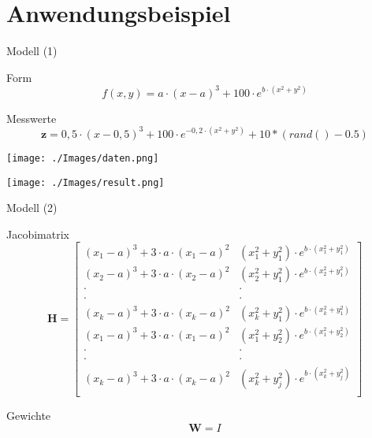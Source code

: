 \documentclass[8pt, t, aspectratio=169,%
]{beamer}
\begin{document}
\section{Anwendungsbeispiel}



\begin{frame}{Modell (1)}

Form
\begin{equation}
	f(x,y) = a \cdot (x-a)^3+100\cdot e^{b\cdot(x^2+y^2)}
\end{equation}


Messwerte
\begin{equation}
	\textbf{z} = 0,5 \cdot (x-0,5)^3+100\cdot e^{-0,2\cdot(x^2+y^2)}+10*(rand()-0.5) 
\end{equation}

\centering
\begin{minipage}{0.5\linewidth}
	\centering
	\texttt{[image: ./Images/daten.png]}
\end{minipage}%
\begin{minipage}{0.5\linewidth}
	\centering
	\texttt{[image: ./Images/result.png]}
\end{minipage}
\end{frame}

\begin{frame}{Modell (2)}

Jacobimatrix
\begin{equation}
	\textbf{H}=
	\begin{bmatrix}
		(x_1-a)^3+3 \cdot a \cdot (x_1-a)^2 & (x_1^2+y_1^2)\cdot e^{b \cdot (x_1^2+y_1^2)}\\
		(x_2-a)^3+3 \cdot a \cdot (x_2-a)^2 & (x_2^2+y_1^2)\cdot e^{b \cdot (x_2^2+y_1^2)}\\
			\cdot&\cdot \\
			\cdot&\cdot \\
		(x_k-a)^3+3 \cdot a \cdot (x_k-a)^2 & (x_k^2+y_1^2)\cdot e^{b \cdot (x_k^2+y_1^2)}\\
		(x_1-a)^3+3 \cdot a \cdot (x_1-a)^2 & (x_1^2+y_2^2)\cdot e^{b \cdot (x_1^2+y_2^2)}\\
			\cdot&\cdot \\
			\cdot&\cdot \\
	 	(x_k-a)^3+3 \cdot a \cdot (x_k-a)^2 & (x_k^2+y_j^2)\cdot e^{b \cdot (x_k^2+y_j^2)}\\	
	\end{bmatrix}
\end{equation}

Gewichte
\begin{equation}
	\textbf{W}=I
\end{equation}



\end{frame}
\end{document}
